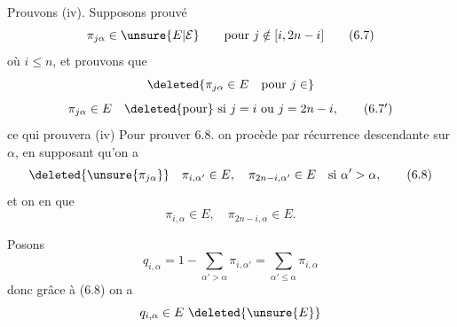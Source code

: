 
Prouvons (iv). Supposons prouvé
\[
 \pi_{j\alpha}\in \unsure{E|\mathcal E}\qquad\text{pour }j\notin[i,2n-i]
 \tag*{(6.7)}
\]
où $i\le n$, et prouvons que
\[
 \deleted{\pi_{j\alpha}\in E\quad\text{pour } j\in}
\]
\[
 \pi_{j\alpha}\in E\quad\deleted{\text{pour}}\ \text{si }j=i\ \text{ou }j=2n-i,
 \tag*{$(6.7')$}
\]
ce qui prouvera (iv)  Pour prouver 6.8. on procède par récurrence  descendante sur $\alpha$, en supposant qu'on a
\[
 \deleted{\unsure{\pi_{j\alpha}}}\quad \pi_{i,\alpha'}\in E,\quad\pi_{2n-i,\alpha'}\in E\quad\text{si }\alpha'>\alpha,
 \tag*{(6.8)}
\]
et on en  que
\[
 \pi_{i,\alpha}\in E,\quad\pi_{2n-i,\alpha}\in E .
 \tag*{$(6.8')$}
\]

Posons
\[
 q_{i,\alpha}=1-\sum_{\alpha'>\alpha}\pi_{i,\alpha'}=\sum_{\alpha'\le\alpha}\pi_{i,\alpha}
\]
donc grâce à (6.8) on a
\[
 q_{i,\alpha}\in E\ \deleted{\unsure{E}}
\]

